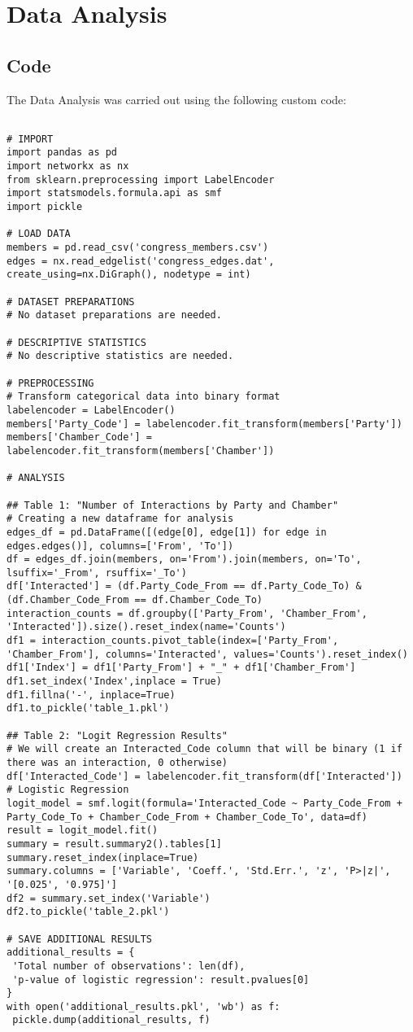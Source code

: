 \documentclass[11pt]{article}
\begin{document}
\section{Data Analysis}
\subsection{{Code}}
The Data Analysis was carried out using the following custom code:

\begin{verbatim}

# IMPORT
import pandas as pd
import networkx as nx
from sklearn.preprocessing import LabelEncoder
import statsmodels.formula.api as smf 
import pickle

# LOAD DATA
members = pd.read_csv('congress_members.csv')
edges = nx.read_edgelist('congress_edges.dat', create_using=nx.DiGraph(), nodetype = int)

# DATASET PREPARATIONS
# No dataset preparations are needed.

# DESCRIPTIVE STATISTICS
# No descriptive statistics are needed.

# PREPROCESSING
# Transform categorical data into binary format
labelencoder = LabelEncoder()
members['Party_Code'] = labelencoder.fit_transform(members['Party'])
members['Chamber_Code'] = labelencoder.fit_transform(members['Chamber'])

# ANALYSIS

## Table 1: "Number of Interactions by Party and Chamber"
# Creating a new dataframe for analysis
edges_df = pd.DataFrame([(edge[0], edge[1]) for edge in edges.edges()], columns=['From', 'To'])
df = edges_df.join(members, on='From').join(members, on='To', lsuffix='_From', rsuffix='_To')
df['Interacted'] = (df.Party_Code_From == df.Party_Code_To) & (df.Chamber_Code_From == df.Chamber_Code_To)
interaction_counts = df.groupby(['Party_From', 'Chamber_From', 'Interacted']).size().reset_index(name='Counts')
df1 = interaction_counts.pivot_table(index=['Party_From', 'Chamber_From'], columns='Interacted', values='Counts').reset_index()
df1['Index'] = df1['Party_From'] + "_" + df1['Chamber_From']
df1.set_index('Index',inplace = True)
df1.fillna('-', inplace=True)
df1.to_pickle('table_1.pkl')

## Table 2: "Logit Regression Results"
# We will create an Interacted_Code column that will be binary (1 if there was an interaction, 0 otherwise)
df['Interacted_Code'] = labelencoder.fit_transform(df['Interacted'])
# Logistic Regression
logit_model = smf.logit(formula='Interacted_Code ~ Party_Code_From + Party_Code_To + Chamber_Code_From + Chamber_Code_To', data=df)
result = logit_model.fit()
summary = result.summary2().tables[1]
summary.reset_index(inplace=True)
summary.columns = ['Variable', 'Coeff.', 'Std.Err.', 'z', 'P>|z|', '[0.025', '0.975]']
df2 = summary.set_index('Variable')
df2.to_pickle('table_2.pkl')

# SAVE ADDITIONAL RESULTS
additional_results = {
 'Total number of observations': len(df), 
 'p-value of logistic regression': result.pvalues[0]
}
with open('additional_results.pkl', 'wb') as f:
 pickle.dump(additional_results, f)

\end{verbatim}
\end{document}
